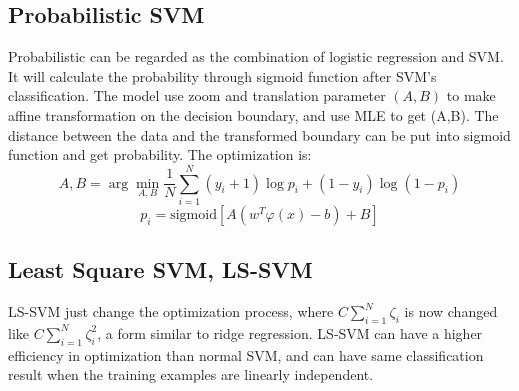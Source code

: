 \documentclass{article}
\begin{document}
\subsection{Probabilistic SVM}
Probabilistic can be regarded as the combination of logistic regression and SVM. It will calculate the probability through sigmoid function after SVM's classification. The model use zoom and translation parameter $(A,B)$ to make affine transformation on the decision boundary, and use MLE to get (A,B)\cite{11}. The distance between the data and the transformed boundary can be put into sigmoid function and get probability. The optimization is:
$$A,B=\arg\min_{A,B}\frac{1}{N}\sum_{i=1}^N(y_i+1)\log p_i+(1-y_i)\log(1-p_i)$$
$$p_i=\mathrm{sigmoid}[A(w^T\varphi(x)-b)+B]$$
\subsection{Least Square SVM, LS-SVM}
LS-SVM just change the optimization process, where $C\sum_{i=1}^N\zeta_i$ is now changed like $C\sum_{i=1}^N\zeta_i^2$, a form similar to ridge regression\cite{12}. LS-SVM can have a higher efficiency in optimization than normal SVM, and can have same classification result when the training examples are linearly independent.
\end{document}
